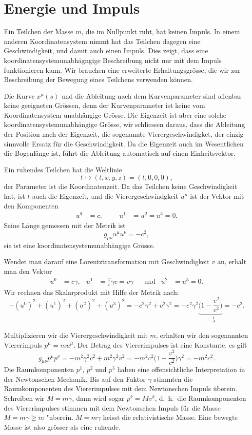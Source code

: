 \section{Energie und Impuls}
\label{skript:speziell:energieimpuls}
Ein Teilchen der Masse $m$, die im Nullpunkt ruht, hat keinen
Impuls.
In einem anderen Koordinatensystem nimmt hat das Teilchen dagegen
eine Geschwindigkeit, und damit auch einen Impuls.
Dies zeigt, dass eine koordinatensystemunabhägngige Beschreibung
nicht nur mit dem Impuls funktionieren kann.
Wir brauchen eine erweiterte Erhaltungsgrösse, die wir zur Beschreibung
der Bewegung eines Teilchens verwenden können.

Die Kurve $x^\mu(s)$ und die Ableitung nach dem Kurvenparameter sind
offenbar keine geeigneten Grössen, denn der Kurvenparameter ist
keine vom Koordinatensystem unabhängige Grösse.
Die Eigenzeit ist aber eine solche koordinatensystemunabhängige
Grösse, wir schliessen daraus, dass die Ableitung der Position
nach der Eigenzeit, die sogenannte Vierergeschwindigket, der einzig
sinnvolle Ersatz für die Geschwindigkeit.
Da die Eigenzeit auch im Wesentlichen die Bogenlänge ist, führt die
Ableitung automatisch auf einen Einheitsvektor.

Ein ruhendes Teilchen hat die Weltlinie
\[
t\mapsto (t, x, y, z)=(t,0,0,0),
\]
der Parameter ist die Koordinatenzeit.
Da das Teilchen keine Geschwindigkeit hat, ist $t$ auch die Eigenzeit,
und die Vierergeschwindgkeit $u^\mu$ ist der Vektor mit den
Komponenten
\[
\begin{aligned}
u^0 &= c,
&&&
u^1&=u^2=u^3 = 0.
\end{aligned}
\]
Seine Länge gemessen mit der Metrik ist
\[
g_{\mu\nu}u^\mu u^\nu=-c^2,
\]
sie ist eine koordinatensystemunabhängige Grösse.

Wendet man darauf eine Lorentztransformation mit Geschwindigkeit $v$ an,
erhält man den Vektor
\[
\begin{aligned}
u^0
&=
c\gamma,
&
u^1
&=
\frac{v}{c}\gamma c
=v\gamma
&&\text{und}
&
u^2&=u^3=0.
\end{aligned}
\]
Wir rechnen das Skalarprodukt mit Hilfe der Metrik nach:
\[
-(u^0)^2 + (u^1)^2 + (u^2)^2 + (u^3)^2
=
-c^2\gamma^2 + v^2\gamma^2
=
-c^2\gamma^2
\underbrace{\biggl(1-\frac{v^2}{c^2}\biggr)}_{\displaystyle=\frac{1}{\gamma^2}}
=
-c^2.
\]

Multiplizieren wir die Vierergeschwindigkeit mit $m$, erhalten wir
den sogenannten Viererimpuls $p^\mu = mu^\mu$.
Der Betrag des Viererimpulses ist eine Konstante, es gilt
\[
g_{\mu\nu}p^\mu p^\nu
=
-
m^2\gamma^2 c^2
+
m^2 \gamma^2 v^2
=
-m^2c^2\biggl(\displaystyle 1-\frac{v^2}{c^2}\biggr)\gamma^2
=
-m^2c^2.
\]
Die Raumkomponenten $p^1$, $p^2$ und $p^3$ haben eine offensichtliche
Interpretation in der Newtonschen Mechanik.
Bis auf den Faktor $\gamma$ stimmten die Raumkomponenten des Viererimpulses
mit dem Newtonschen Impuls überein.
Schreiben wir $M=m\gamma$, dann wird sogar $p^k = M v^k$, d.~h.~die
Raumkomponenten des Viererimpulses stimmen mit dem Newtonschen Impuls 
für die Masse $M=m\gamma  \ge m$ "uberein.
$M=m\gamma$ heisst die relativistische Masse.
Eine bewegte Masse ist also grösser als eine ruhende.

